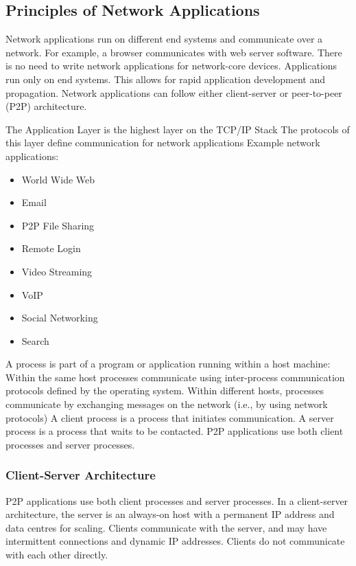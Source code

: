 \subsection{Principles of Network Applications}

Network applications run on different end systems and communicate over a network.
For example, a browser communicates with web server software.
There is no need to write network applications for network-core devices.
Applications run only on end systems.
This allows for rapid application development and propagation.
Network applications can follow either client-server or peer-to-peer (P2P) architecture.

The Application Layer is the highest layer on the
TCP/IP Stack
The protocols of this layer define communication
for network applications
Example network applications:
\begin{itemize}
  \item World Wide Web
  \item Email
  \item P2P File Sharing
  \item Remote Login
  \item Video Streaming
  \item VoIP
  \item Social Networking
  \item Search
\end{itemize}
A process is part of a program or application running within a host machine:
\newline
Within the same host processes communicate using inter-process communication protocols defined by the operating system.
\newline
Within different hosts, processes communicate by exchanging messages on the network (i.e., by using network protocols)
A client process is a process that initiates communication.
A server process is a process that waits to be contacted. P2P applications use both client processes and server processes.
\subsubsection{Client-Server Architecture}
P2P applications use both client processes and server processes.
In a client-server architecture, the server is an always-on host with a permanent IP address and data centres for scaling.
Clients communicate with the server, and may have intermittent connections and dynamic IP addresses.
Clients do not communicate with each other directly.
\newline
